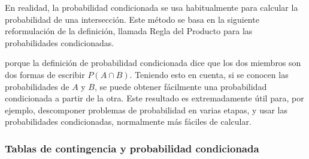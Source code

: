 En realidad, la probabilidad condicionada se usa habitualmente para calcular
la probabilidad de una intersección. Este método se basa en la siguiente
reformulación de la definición, llamada {\sf Regla del Producto} para las
probabilidades condicionadas.
        \begin{center}
        \end{center}
porque la definición de probabilidad condicionada dice que los dos miembros son dos formas de escribir $P(A\cap B)$. Teniendo esto en cuenta, si se conocen las probabilidades de $A$ y $B$, se puede obtener fácilmente una probabilidad condicionada a partir de la otra. Este resultado es extremadamente útil para, por ejemplo, descomponer problemas de probabilidad en varias etapas, y usar las probabilidades condicionadas, normalmente más fáciles de calcular.

\subsubsection{Tablas de contingencia y probabilidad condicionada}
\label{cap03:subsubsec:TablasContingenciaProbabilidadCondicionada}

